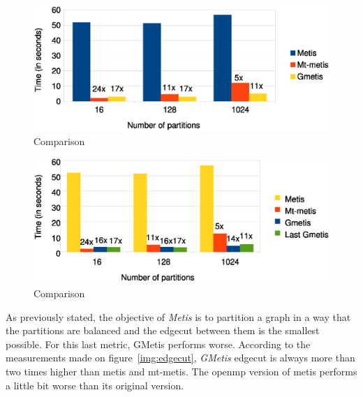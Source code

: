 \documentclass[abstract=on,9pt,twocolumn]{scrartcl}
\begin{document}

\begin{center}
\begin{figure}[htb]
    \includegraphics[width=\columnwidth]{img/comparison3.eps}
    \caption{Comparison}
    \label{img:comparison3}
\end{figure}
\end{center}

\begin{center}
\begin{figure}[htb]
    \includegraphics[width=\columnwidth]{img/comparison4.eps}
    \caption{Comparison}
    \label{img:comparison4}
\end{figure}
\end{center}

As previously stated, the objective of \textit{Metis} is to partition a graph in a way
that the partitions are balanced and the edgecut between them is the smallest
possible. For this last metric, GMetis performs worse. According to the
measurements made on figure~\ref{img:edgecut}, \textit{GMetis} edgecut is
always more than two times higher than metis and mt-metis. The openmp
version of metis performs a little bit worse than its original version.
\end{document}
